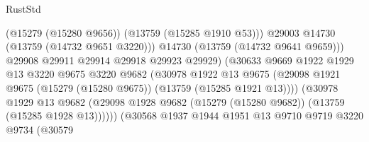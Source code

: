 \begin{lexlean}{RustStd}
\begin{coremodule}
                                                (@15279 (@15280 @9656))
                                                (@13759 (@15285 @1910 @53)))
                                              @29003
                                              @14730
                                              (@13759 (@14732 @9651 @3220)))
                                            @14730
                                            (@13759 (@14732 @9641 @9659)))
                                          @29908
                                          @29911
                                          @29914
                                          @29918
                                          @29923
                                          @29929)
                                        (@30633
                                          @9669
                                          @1922
                                          @1929
                                          @13
                                          @3220
                                          @9675
                                          @3220
                                          @9682
                                          (@30978
                                            @1922
                                            @13
                                            @9675
                                            (@29098
                                              @1921
                                              @9675
                                              (@15279 (@15280 @9675))
                                              (@13759 (@15285 @1921 @13))))
                                          (@30978
                                            @1929
                                            @13
                                            @9682
                                            (@29098
                                              @1928
                                              @9682
                                              (@15279 (@15280 @9682))
                                              (@13759 (@15285 @1928 @13))))))
                                      (@30568
                                        @1937
                                        @1944
                                        @1951
                                        @13
                                        @9710
                                        @9719
                                        @3220
                                        @9734
                                        (@30579

\end{coremodule}
\end{lexlean}

